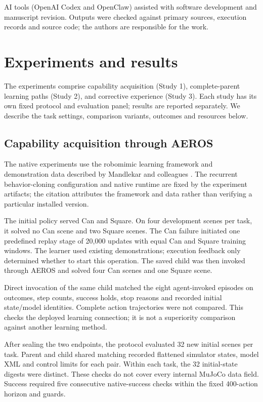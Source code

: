\documentclass[10pt,letterpaper]{article}
\begin{document}
AI tools (OpenAI Codex and OpenClaw) assisted with software development and manuscript revision. Outputs were checked against primary sources, execution records and source code; the authors are responsible for the work.

\section{Experiments and results}\label{experiments-and-results}

The experiments comprise capability acquisition (Study 1),
complete-parent learning paths (Study 2), and corrective experience
(Study 3). Each study has its own fixed protocol and evaluation panel;
results are reported separately. We describe the task settings,
comparison variants, outcomes and resources below.

\subsection{Capability acquisition through
AEROS}\label{capability-acquisition-through-aeros}

The native experiments use the robomimic learning framework and
demonstration data described by Mandlekar and colleagues
\cite{pmlr-v164-mandlekar22a}. The recurrent behavior-cloning
configuration and native runtime are fixed by the experiment artifacts;
the citation attributes the framework and data rather than verifying a
particular installed version.

The initial policy served Can and Square. On four development scenes per
task, it solved no Can scene and two Square scenes. The Can failure
initiated one predefined replay stage of 20,000 updates with equal Can
and Square training windows. The learner used existing demonstrations;
execution feedback only determined whether to start this operation. The
saved child was then invoked through AEROS and solved four Can scenes
and one Square scene.

Direct invocation of the same child matched the eight agent-invoked
episodes on outcomes, step counts, success holds, stop reasons and
recorded initial state/model identities. Complete action trajectories
were not compared. This checks the deployed learning connection; it is
not a superiority comparison against another learning method.

After sealing the two endpoints, the protocol evaluated 32 new initial
scenes per task. Parent and child shared matching recorded flattened
simulator states, model XML and control limits for each pair. Within
each task, the 32 initial-state digests were distinct. These checks do
not cover every internal MuJoCo data field. Success required five
consecutive native-success checks within the fixed 400-action horizon
and guards.
\end{document}
